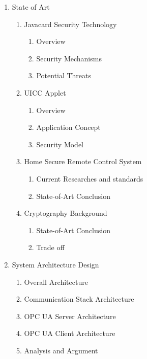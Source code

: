 \documentclass[]{llncs}
\begin{document}
\begin{enumerate}
\begin{enumerate}[label*=\arabic*.]
\begin{enumerate}[label*=\arabic*.]
		\end{enumerate}
	\end{enumerate}
	\item State of Art
  	\begin{enumerate}[label*=\arabic*.]
    	\item Javacard Security Technology
		\begin{enumerate}[label*=\arabic*.]
		\item Overview
		\item Security Mechanisms
		\item Potential Threats
		\end{enumerate}
    	\item UICC Applet
		\begin{enumerate}[label*=\arabic*.]
		\item Overview
		\item Application Concept
		\item Security Model
		\end{enumerate}

    	\item Home Secure Remote Control System
		\begin{enumerate}[label*=\arabic*.]
		\item Current Researches and standards
		\item State-of-Art Conclusion
		\end{enumerate}

    	\item Cryptography Background
		\begin{enumerate}[label*=\arabic*.]
		\item State-of-Art Conclusion
		\item Trade off
		\end{enumerate}
	\end{enumerate}

\item System Architecture Design 
  	\begin{enumerate}[label*=\arabic*.]
	\item Overall Architecture
    	\item Communication Stack Architecture
    	\item OPC UA Server Architecture 
    	\item OPC UA Client Architecture
    	\item Analysis and Argument
	\end{enumerate}


\end{enumerate}
\end{document}
